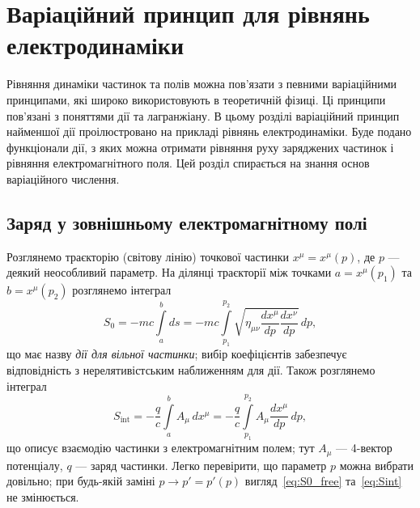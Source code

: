 

\chapter{Варіаційний принцип для рівнянь електродинаміки}\label{\currfilebase}

Рівняння динаміки частинок та полів можна пов'язати з певними варіаційними принципами, які широко використовують в теоретичній фізиці. Ці принципи пов'язані з поняттями дії та лагранжіану. В цьому розділі варіаційний принцип найменшої дії проілюстровано на прикладі рівнянь електродинаміки. Буде подано функціонали дії, з яких можна отримати рівняння руху заряджених частинок і рівняння електромагнітного поля. Цей розділ спирається на знання основ варіаційного числення.

\section{Заряд у зовнішньому електромагнітному полі}

Розглянемо траєкторію (світову лінію) точкової частинки $x^{\mu}=x^{\mu}(p)$, де $p$ --- деякий неособливий параметр. На ділянці траєкторії між точками $a=x^{\mu}(p_1)$ та $b=x^{\mu}(p_2)$ розглянемо інтеграл
\begin{equation}\label{eq:S0_free}
    S_0 = -mc\int\limits_a^b ds
    = -mc\int\limits_{p_1}^{p_2}
    \sqrt{\eta_{\mu\nu}\frac{dx^{\mu}}{dp}\frac{dx^{\nu}}{dp}}\,dp,
\end{equation}
що має назву \emph{дії для вільної частинки}; вибір коефіцієнтів забезпечує відповідність з нерелятивістським наближенням для дії. Також розглянемо інтеграл
\begin{equation}\label{eq:Sint}
    S_{\text{int}} = -\frac{q}{c}\int\limits_a^b A_{\mu}\,dx^{\mu}
    = -\frac{q}{c}\int\limits_{p_1}^{p_2} A_{\mu}\frac{dx^{\mu}}{dp}\,dp,
\end{equation}
що описує взаємодію частинки з електромагнітним полем; тут $A_{\mu}$ --- 4-вектор потенціалу, $q$ --- заряд частинки. Легко перевірити, що параметр $p$ можна вибрати довільно; при будь-якій заміні $p\to p'=p'(p)$ вигляд~\eqref{eq:S0_free} та~\eqref{eq:Sint} не змінюється.

